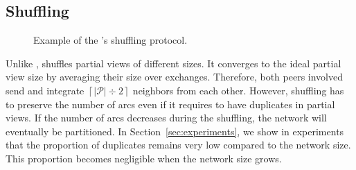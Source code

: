 
\subsection{Shuffling}
\label{subsec:cyclic}

\begin{figure*}
  \centering
  \hspace{10pt}
  \hspace{10pt}
  \caption{\label{fig:cyclicexample}Example of the \SPRAY{}'s shuffling
    protocol. }
\end{figure*}





Unlike \CYCLON{}, \SPRAY{} shuffles partial views of different sizes. It
converges to the ideal partial view size by averaging their size over
exchanges. Therefore, both peers involved send and integrate
$\left\lceil|\mathcal{P}| \div 2 \right\rceil$ neighbors from each
other. However, shuffling has to preserve the number of arcs even if it
requires to have duplicates in partial views. If the number of arcs decreases
during the shuffling, the network will eventually be partitioned. In
Section~\ref{sec:experiments}, we show in experiments that the proportion of
duplicates remains very low compared to the network size. This proportion
becomes negligible when the network size grows. 

